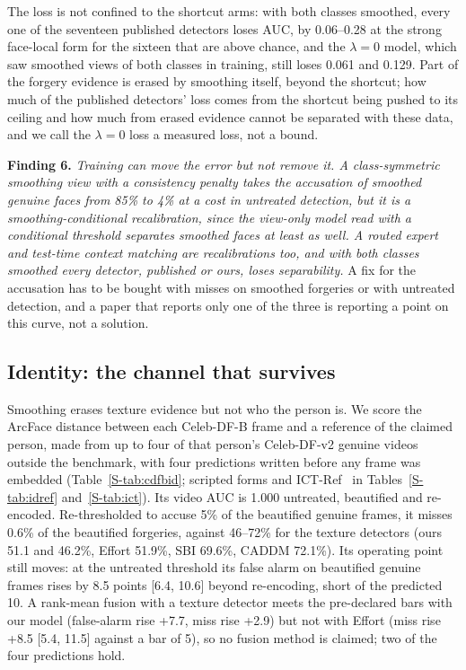 \documentclass[conference]{IEEEtran}
\begin{document}
The loss is not confined to the shortcut arms: with both classes smoothed, every one of the seventeen published detectors
loses AUC, by 0.06--0.28 at
the strong face-local form for the sixteen that are above chance, and the $\lambda=0$ model, which saw smoothed views of both
classes in training, still loses 0.061 and 0.129.
Part of the forgery evidence is erased by smoothing itself, beyond the shortcut; how much of the published detectors'
loss comes from the shortcut being pushed to its ceiling and how much from erased evidence cannot be separated with these
data, and we call the $\lambda=0$ loss a measured loss, not a bound.

\textbf{Finding 6.} \emph{Training can move the error but not remove it. A class-symmetric smoothing view with a
consistency penalty takes the accusation of smoothed genuine faces from 85\% to 4\% at a cost in untreated detection, but it is
a smoothing-conditional recalibration, since the view-only model read with a conditional threshold separates smoothed
faces at least as well. A routed expert and test-time context matching are recalibrations too, and with both classes
smoothed every detector, published or ours, loses separability.}
A fix for the accusation has to be bought with misses on smoothed forgeries or with untreated detection, and a
paper that reports only one of the three is reporting a point on this curve, not a solution.

\subsection{Identity: the channel that survives}
\label{sec:identity}
Smoothing erases texture evidence but not who the person is. We score the ArcFace distance between each Celeb-DF-B frame and
a reference of the claimed person, made from up to four of that person's Celeb-DF-v2 genuine videos outside the benchmark, with
four predictions written before any frame was embedded (Table~\ref{S-tab:cdfbid}; scripted forms and ICT-Ref~\cite{ict2022} in
Tables~\ref{S-tab:idref} and~\ref{S-tab:ict}). Its video AUC is 1.000 untreated, beautified and re-encoded. Re-thresholded to
accuse 5\% of the beautified genuine frames, it misses 0.6\% of the beautified forgeries, against 46--72\% for the texture
detectors (ours 51.1 and 46.2\%, Effort 51.9\%, SBI 69.6\%, CADDM 72.1\%). Its operating point still moves: at the untreated
threshold its false alarm on beautified genuine frames rises by 8.5 points [6.4, 10.6] beyond re-encoding, short of the
predicted 10. A rank-mean fusion with a texture detector meets the pre-declared bars with our model (false-alarm rise +7.7, miss
rise +2.9) but not with Effort (miss rise +8.5 [5.4, 11.5] against a bar of 5), so no fusion method is claimed; two of the four predictions hold.
\end{document}
